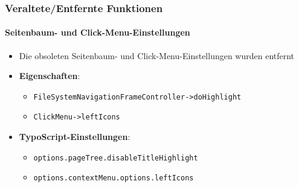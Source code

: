 
\begin{frame}[fragile]
	\frametitle{Veraltete/Entfernte Funktionen}
	\framesubtitle{Seitenbaum- und Click-Menu-Einstellungen}

	\begin{itemize}

		\item Die obsoleten Seitenbaum- und Click-Menu-Einstellungen wurden entfernt
		\item \textbf{Eigenschaften}:

		\begin{itemize}
			\item \texttt{FileSystemNavigationFrameController->doHighlight}
			\item \texttt{ClickMenu->leftIcons}
		\end{itemize}

		\item \textbf{TypoScript-Einstellungen}:

		\begin{itemize}
			\item \texttt{options.pageTree.disableTitleHighlight}
			\item \texttt{options.contextMenu.options.leftIcons}
		\end{itemize}

	\end{itemize}

\end{frame}


